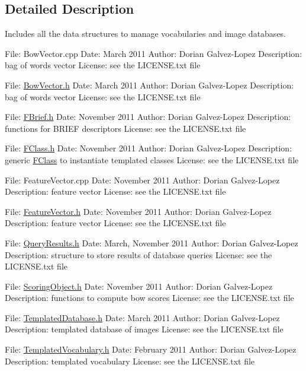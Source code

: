 \subsection{Detailed Description}
Includes all the data structures to manage vocabularies and image databases. 

File\+: Bow\+Vector.\+cpp Date\+: March 2011 Author\+: Dorian Galvez-\/\+Lopez Description\+: bag of words vector License\+: see the L\+I\+C\+E\+N\+S\+E.\+txt file

File\+: \hyperlink{BowVector_8h_source}{Bow\+Vector.\+h} Date\+: March 2011 Author\+: Dorian Galvez-\/\+Lopez Description\+: bag of words vector License\+: see the L\+I\+C\+E\+N\+S\+E.\+txt file

File\+: \hyperlink{FBrief_8h_source}{F\+Brief.\+h} Date\+: November 2011 Author\+: Dorian Galvez-\/\+Lopez Description\+: functions for B\+R\+I\+EF descriptors License\+: see the L\+I\+C\+E\+N\+S\+E.\+txt file

File\+: \hyperlink{FClass_8h_source}{F\+Class.\+h} Date\+: November 2011 Author\+: Dorian Galvez-\/\+Lopez Description\+: generic \hyperlink{classDBoW2_1_1FClass}{F\+Class} to instantiate templated classes License\+: see the L\+I\+C\+E\+N\+S\+E.\+txt file

File\+: Feature\+Vector.\+cpp Date\+: November 2011 Author\+: Dorian Galvez-\/\+Lopez Description\+: feature vector License\+: see the L\+I\+C\+E\+N\+S\+E.\+txt file

File\+: \hyperlink{FeatureVector_8h_source}{Feature\+Vector.\+h} Date\+: November 2011 Author\+: Dorian Galvez-\/\+Lopez Description\+: feature vector License\+: see the L\+I\+C\+E\+N\+S\+E.\+txt file

File\+: \hyperlink{QueryResults_8h_source}{Query\+Results.\+h} Date\+: March, November 2011 Author\+: Dorian Galvez-\/\+Lopez Description\+: structure to store results of database queries License\+: see the L\+I\+C\+E\+N\+S\+E.\+txt file

File\+: \hyperlink{ScoringObject_8h_source}{Scoring\+Object.\+h} Date\+: November 2011 Author\+: Dorian Galvez-\/\+Lopez Description\+: functions to compute bow scores License\+: see the L\+I\+C\+E\+N\+S\+E.\+txt file

File\+: \hyperlink{TemplatedDatabase_8h_source}{Templated\+Database.\+h} Date\+: March 2011 Author\+: Dorian Galvez-\/\+Lopez Description\+: templated database of images License\+: see the L\+I\+C\+E\+N\+S\+E.\+txt file

File\+: \hyperlink{TemplatedVocabulary_8h_source}{Templated\+Vocabulary.\+h} Date\+: February 2011 Author\+: Dorian Galvez-\/\+Lopez Description\+: templated vocabulary License\+: see the L\+I\+C\+E\+N\+S\+E.\+txt file 

